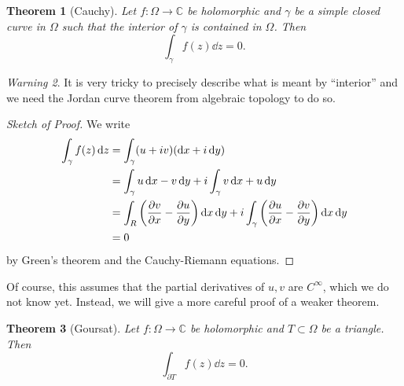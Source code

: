 \documentclass[leqno, openany]{memoir}
\newtheorem{thm}{Theorem}[section]
\theoremstyle{definition}
\theoremstyle{remark}
\newtheorem{warn}[thm]{Warning}
\theoremstyle{plain}
\theoremstyle{definition}
\theoremstyle{remark}
\newcommand{\C}{\mathbb{C}}
\begin{document}
\begin{thm}[Cauchy]
    Let $f \colon \Omega \to \C$ be holomorphic and $\gamma$ be a simple closed curve in $\Omega$ such that the interior of $\gamma$ is contained in $\Omega$. Then
    \[ \int_{\gamma} f(z) \dd{z} = 0. \]
\end{thm}

\begin{warn}
    It is very tricky to precisely describe what is meant by ``interior'' and we need the Jordan curve theorem from algebraic topology to do so.
\end{warn}

\begin{proof}[Sketch of Proof]
    We write
    \begin{align*}
        \int_{\gamma} f(z) \dd{z} &= \int_{\gamma} (u+iv) (\dd{x} + i \dd{y}) \\
                                  &= \int_{\gamma} u \dd{x} - v \dd{y} + i \int_{\gamma} v \dd{x} + u \dd{y} \\
                                  &= \int_R \qty(\pdv{v}{x} - \pdv{u}{y}) \dd{x} \dd{y} + i \int_{\gamma} \qty(\pdv{u}{x} - \pdv{v}{y}) \dd{x} \dd{y} \\
                                  &= 0
    \end{align*}
    by Green's theorem and the Cauchy-Riemann equations.
\end{proof}

Of course, this assumes that the partial derivatives of $u,v$ are $C^{\infty}$, which we do not know yet. Instead, we will give a more careful proof of a weaker theorem.

\begin{thm}[Goursat]
    Let $f \colon \Omega \to \C$ be holomorphic and $T \subset \Omega$ be a triangle. Then 
    \[ \int_{\partial T} f(z) \dd{z} = 0. \]
\end{thm}
\end{document}
